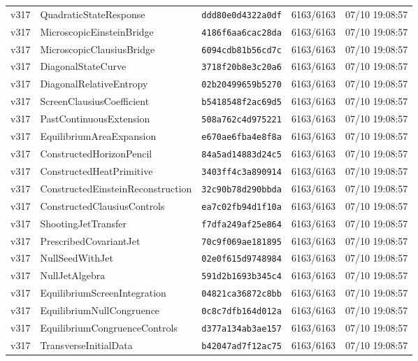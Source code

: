 \documentclass[11pt]{article}
\theoremstyle{definition}\newtheorem{deriv}{Derivation}
\begin{document}
{\begin{longtable}{@{}lllll@{}}
v317 & QuadraticStateResponse & \texttt{ddd80e0d4322a0df} & 6163/6163 & 07/10 19:08:57 \\
v317 & MicroscopicEinsteinBridge & \texttt{4186f6aa6cac28da} & 6163/6163 & 07/10 19:08:57 \\
v317 & MicroscopicClausiusBridge & \texttt{6094cdb81b56cd7c} & 6163/6163 & 07/10 19:08:57 \\
v317 & DiagonalStateCurve & \texttt{3718f20b8e3c20a6} & 6163/6163 & 07/10 19:08:57 \\
v317 & DiagonalRelativeEntropy & \texttt{02b20499659b5270} & 6163/6163 & 07/10 19:08:57 \\
v317 & ScreenClausiusCoefficient & \texttt{b5418548f2ac69d5} & 6163/6163 & 07/10 19:08:57 \\
v317 & PastContinuousExtension & \texttt{508a762c4d975221} & 6163/6163 & 07/10 19:08:57 \\
v317 & EquilibriumAreaExpansion & \texttt{e670ae6fba4e8f8a} & 6163/6163 & 07/10 19:08:57 \\
v317 & ConstructedHorizonPencil & \texttt{84a5ad14883d24c5} & 6163/6163 & 07/10 19:08:57 \\
v317 & ConstructedHeatPrimitive & \texttt{3403ff4c3a890914} & 6163/6163 & 07/10 19:08:57 \\
v317 & ConstructedEinsteinReconstruction & \texttt{32c90b78d290bbda} & 6163/6163 & 07/10 19:08:57 \\
v317 & ConstructedClausiusControls & \texttt{ea7c02fb94d1f10a} & 6163/6163 & 07/10 19:08:57 \\
v317 & ShootingJetTransfer & \texttt{f7dfa249af25e864} & 6163/6163 & 07/10 19:08:57 \\
v317 & PrescribedCovariantJet & \texttt{70c9f069ae181895} & 6163/6163 & 07/10 19:08:57 \\
v317 & NullSeedWithJet & \texttt{02e0f615d9748984} & 6163/6163 & 07/10 19:08:57 \\
v317 & NullJetAlgebra & \texttt{591d2b1693b345c4} & 6163/6163 & 07/10 19:08:57 \\
v317 & EquilibriumScreenIntegration & \texttt{04821ca36872c8bb} & 6163/6163 & 07/10 19:08:57 \\
v317 & EquilibriumNullCongruence & \texttt{0c8c7dfb164d012a} & 6163/6163 & 07/10 19:08:57 \\
v317 & EquilibriumCongruenceControls & \texttt{d377a134ab3ae157} & 6163/6163 & 07/10 19:08:57 \\
v317 & TransverseInitialData & \texttt{b42047ad7f12ac75} & 6163/6163 & 07/10 19:08:57 \\

\end{longtable}}
\end{document}
